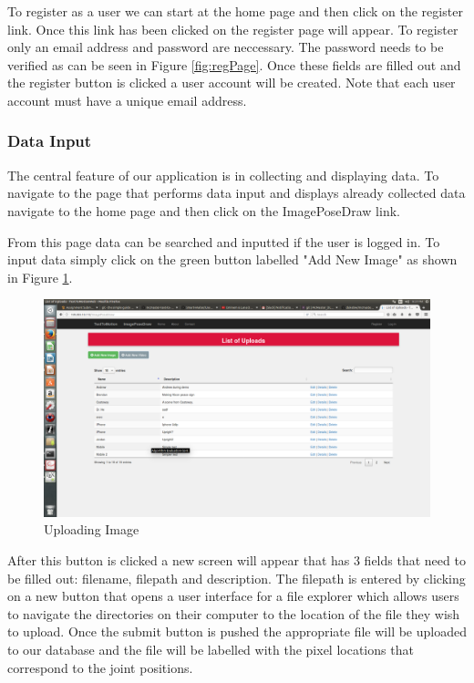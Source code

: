 \documentclass{scrreprt}
\begin{document}
To register as a user we can start at the home page and then click on the register link.  Once this link has been clicked on the register page will appear.  To register only an email address and password are neccessary. 
The password needs to be verified as can be seen in Figure \ref{fig:regPage}. Once these fields are filled out and the register button is clicked a user account will be created.  Note that each user account must have a unique email address.

\subsubsection{Data Input}


The central feature of our application is in collecting and displaying data.  To navigate to the page that performs data input and displays already collected data navigate to the home page and then click on the ImagePoseDraw link. 

From this page data can be searched and inputted if the user is logged in.  To input data simply click on the green button labelled "Add New Image" as shown in Figure \ref{fig:uploadPage}. 

\begin{figure}
  \includegraphics[width=\linewidth]{uploadPage.png}
  \caption{Uploading Image}
  \label{fig:uploadPage}
\end{figure}

After this button is clicked a new screen will appear that has 3 fields that need to be filled out: filename, filepath and description.  The filepath is entered by clicking on a new button that opens a user interface for a file explorer which allows users to navigate the directories on their computer to the location of the file they wish to upload.  Once the submit button is pushed the appropriate file will be uploaded to our database and the file will be labelled with the pixel locations that correspond to the joint positions.  
\end{document}
